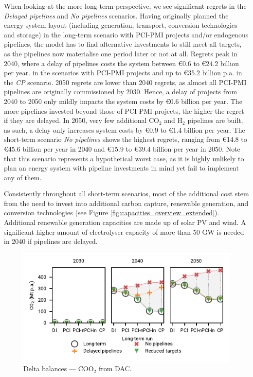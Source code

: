 \documentclass[pdflatex,sn-nature]{sn-jnl}%
\theoremstyle{thmstyleone}%
\theoremstyle{thmstyletwo}%
\theoremstyle{thmstylethree}%
\begin{document}
When looking at the more long-term perspective, we see significant regrets in the \textit{Delayed pipelines} and \textit{No pipelines} scenarios. Having originally planned the energy system layout (including generation, transport, conversion technologies and storage) in the long-term scenario with PCI-PMI projects and/or endogenous pipelines, the model has to find alternative investments to still meet all targets, as the pipelines now materialise one period later or not at all. Regrets peak in 2040, where a delay of pipelines costs the system between €0.6 to €24.2 billion per year. in the scenarios with PCI-PMI projects and up to €35.2 billion p.a. in the \textit{CP} scenario. 2050 regrets are lower than 2040 regrets, as almost all PCI-PMI pipelines are originally commissioned by 2030. Hence, a delay of projects from 2040 to 2050 only mildly impacts the system costs by €0.6 billion per year. The more pipelines invested beyond those of PCI-PMI projects, the higher the regret if they are delayed. In 2050, very few additional CO$_2$ and H$_2$ pipelines are built, as such, a delay only increases system costs by €0.9 to €1.4 billion per year. 
The short-term scenario \textit{No pipelines} shows the highest regrets, ranging from €14.8 to €45.6 billion per year in 2040 and €15.9 to €39.4 billion per year in 2050. Note that this scenario represents a hypothetical worst case, as it is highly unlikely to plan an energy system with pipeline investments in mind yet fail to implement any of them.

Consistently throughout all short-term scenarios, most of the additional cost stem from the need to invest into additional carbon capture, renewable generation, and conversion technologies (see Figure \ref{fig:capacities_overview_extended}). Additional renewable generation capacities are made up of solar PV and wind. A significant higher amount of electrolyser capacity of more than 50 GW is needed in 2040 if pipelines are delayed. 

\begin{figure}[htbp]
  \centering
  \includegraphics{figures/delta_balances_DAC}
  \caption{Delta balances --- COO$_2$ from DAC.}
  \label{fig:delta_balances_dac}
\end{figure}
\end{document}
